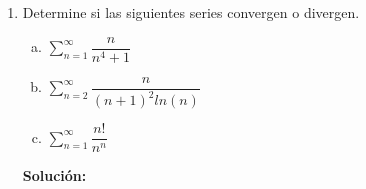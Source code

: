\documentclass[12pt]{article}
\newenvironment{solucion}
{\begin{mdframed}[backgroundcolor=black!10]
		{\bf Solución:}\\
	}
	{
	\end{mdframed}
}
\newenvironment{preguntas}
{\begin{enumerate}\itemsep12pt
	}
	{
	\end{enumerate}
}
\newcommand{\ev}{\Big|}
\newcommand{\ra}{\rightarrow}
\begin{document}
\begin{preguntas}
\begin{solucion}
\begin{enumerate}[a)]
			\\
			Sea
			$$a_n = \dfrac{1}{nln(n)ln(ln(n))} \ra f(x) = \dfrac{1}{xln(x)ln(ln(x))}$$
			Usando el criterio de la integral, $\displaystyle\int_{20}^{\infty}f(x)dx$ se comportará igual que $\sum\limits_{n=20}^{\infty} a_n$, por lo que debemos ver la convergencia de la integral en cuestión
			$$\int_{20}^{\infty} \dfrac{1}{xln(x)ln(ln(x))} dx$$
			Usando $u=ln(ln(x)) \ra du = \dfrac{dx}{xln(x)}$,
			$$\int_{20}^{\infty} \dfrac{1}{xln(x)ln(ln(x))} dx
			= \int_{ln(ln(20))}^{\infty} \dfrac{du}{u} = ln(u) \ev_{ln(ln(20))}^{\infty}$$
			$$ = ln(\infty) - ln(ln(ln(20))) = \infty = \not \exists$$
			Finalmente, por el criterio de la integral, la serie converge.
\item  $\sum\limits_{n=1}^{\infty}ln\left(1+\dfrac{1}{n}\right)$\\
			\\
			Notemos que
			$$\sum\limits_{n=1}^{\infty} ln\left(1+\dfrac{1}{n}\right)
			= \sum\limits_{n=1}^{\infty} ln\left(\dfrac{n+1}{n}\right)
			= \sum\limits_{n=1}^{\infty} ln(n+1)-ln(n)$$
			Es una serie telescopica. Expandiendo términos
			$$= (ln(2)-ln(1)) + (ln(3)-ln(2)) + \dots + (ln(n) - ln(n-1)) + (ln(n+1) - ln(n))$$
			$$= (\cancel{ln(2)}-ln(1)) + (\cancel{ln(3)}-\cancel{ln(2)}) + \cancel{\dots} + (\cancel{ln(n)} - \cancel{ln(n-1)}) + (ln(n+1) - \cancel{ln(n)})$$
			$$= ln(n+1) - ln(1)$$
			$$\lim\limits_{n \ra \infty} ln(n+1) = ln(\infty) = \infty = \not \exists$$
			Finalmente, la serie es divergente.
\end{enumerate}
\end{solucion}
\item Determine si las siguientes series convergen o divergen.
\begin{enumerate}[a)]
\item $\sum\limits_{n=1}^{\infty}\dfrac{n}{n^4+1}$
\item $\sum\limits_{n=2}^{\infty}\dfrac{n}{(n+1)^2ln(n)}$
\item $\sum\limits_{n=1}^{\infty}\dfrac{n!}{n^n}$
\end{enumerate}
\begin{solucion}


\end{solucion}
\end{preguntas}
\end{document}
